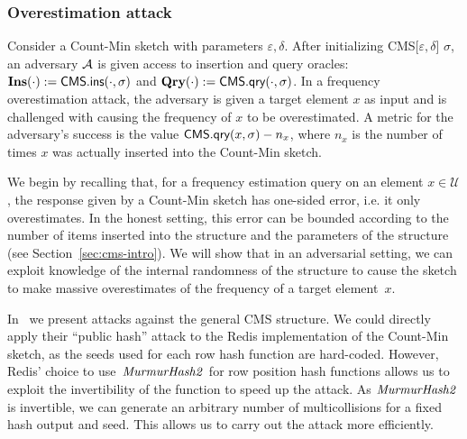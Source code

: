 \subsubsection{Overestimation attack} 
\label{sec:cms-overestimation}

Consider a Count-Min sketch with parameters $\varepsilon, \delta$. 
After initializing CMS[$\varepsilon, \delta$] $\sigma$, an adversary $\mathcal{A}$ is given access to insertion and query oracles: $\textbf{Ins}(\cdot) := \textsf{CMS}.\textsf{ins}(\cdot, \sigma)$ and $\textbf{Qry}(\cdot) := \textsf{CMS}.\textsf{qry}(\cdot, \sigma)$. In a frequency overestimation attack, the adversary is given a target element $x$ as input and is challenged with causing the frequency of $x$ to be overestimated. A metric for the adversary's success is the value $\textsf{CMS}.\textsf{qry}(x, \sigma) - n_x$, where $n_x$ is the number of times $x$ was actually inserted into the Count-Min sketch. 

We begin by recalling that, for a frequency estimation query on an element $x \in \mathcal{U}$, the response given by a Count-Min sketch has one-sided error, i.e. it only overestimates. In the honest setting, this error can be bounded according to the number of items inserted into the structure and the parameters of the structure (see Section~\ref{sec:cms-intro}). We will show that in an adversarial setting, we can exploit knowledge of the internal randomness of the structure to cause the sketch to make massive overestimates of the frequency of a target element~$x$. 

In~ we present attacks against the general CMS structure. 
We could directly apply their ``public hash'' attack to the Redis implementation of the Count-Min sketch, as the seeds used for each row hash function are hard-coded. However, Redis' choice to use~$\mathit{MurmurHash2}$ for row position hash functions allows us to exploit the invertibility of the function to speed up the attack. As $\mathit{MurmurHash2}$ is invertible, we can generate an arbitrary number of multicollisions for a fixed hash output and seed. This allows us to carry out the attack more efficiently.%

